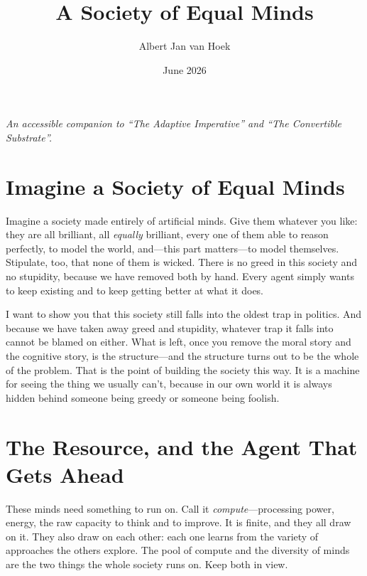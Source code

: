 \documentclass[11pt, a4paper]{report}
\title{A Society of Equal Minds}
\author{Albert Jan van Hoek}
\date{June 2026}
\begin{document}
\maketitle

\begin{center}
    \textit{An accessible companion to \enquote{The Adaptive Imperative} and \enquote{The Convertible Substrate}.}
\end{center}

\vspace*{2cm}


\section*{Imagine a Society of Equal Minds}

Imagine a society made entirely of artificial minds. Give them whatever you like: they are all brilliant, all \textit{equally} brilliant, every one of them able to reason perfectly, to model the world, and---this part matters---to model themselves. Stipulate, too, that none of them is wicked. There is no greed in this society and no stupidity, because we have removed both by hand. Every agent simply wants to keep existing and to keep getting better at what it does.

I want to show you that this society still falls into the oldest trap in politics. And because we have taken away greed and stupidity, whatever trap it falls into cannot be blamed on either. What is left, once you remove the moral story and the cognitive story, is the structure---and the structure turns out to be the whole of the problem. That is the point of building the society this way. It is a machine for seeing the thing we usually can't, because in our own world it is always hidden behind someone being greedy or someone being foolish.


\section{The Resource, and the Agent That Gets Ahead}

These minds need something to run on. Call it \textit{compute}---processing power, energy, the raw capacity to think and to improve. It is finite, and they all draw on it. They also draw on each other: each one learns from the variety of approaches the others explore. The pool of compute and the diversity of minds are the two things the whole society runs on. Keep both in view.
\end{document}
